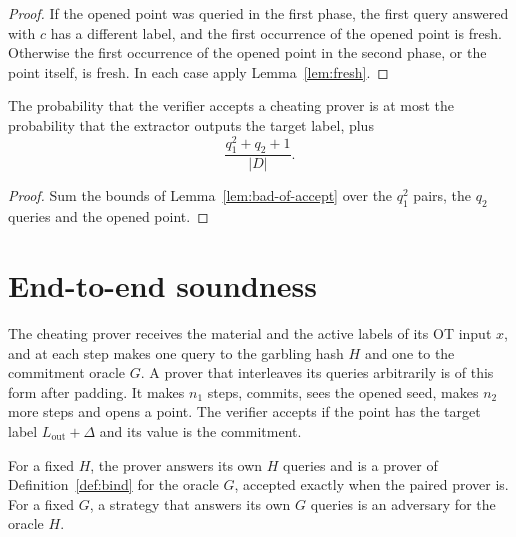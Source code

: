 \begin{proof}
  \leanok
  If the opened point was queried in the first phase, the first query answered with $c$ has a
  different label, and the first occurrence of the opened point is fresh. Otherwise the first
  occurrence of the opened point in the second phase, or the point itself, is fresh. In each case
  apply Lemma~\ref{lem:fresh}.
\end{proof}

\begin{theorem}
  \label{thm:binding}
  \leanok
  The probability that the verifier accepts a cheating prover is at most the probability that the
  extractor outputs the target label, plus
  \[ \frac{q_1^2 + q_2 + 1}{|D|} . \]
\end{theorem}

\begin{proof}
  \leanok
  Sum the bounds of Lemma~\ref{lem:bad-of-accept} over the $q_1^2$ pairs, the $q_2$ queries and the
  opened point.
\end{proof}

\section{End-to-end soundness}

\begin{definition}
  \label{def:pprover}
  \leanok
  The cheating prover receives the material and the active labels of its OT input $x$, and at
  each step makes one query to the garbling hash $H$ and one to the commitment oracle $G$. A prover
  that interleaves its queries arbitrarily is of this form after padding. It makes $n_1$ steps,
  commits, sees the opened seed, makes $n_2$ more steps and opens a point. The verifier accepts if
  the point has the target label $L_{\mathrm{out}} + \Delta$ and its value is the commitment.
\end{definition}

\begin{lemma}[Replays]
  \label{lem:replay}
  \leanok
  For a fixed $H$, the prover answers its own $H$ queries and is a prover of
  Definition~\ref{def:bind} for the oracle $G$, accepted exactly when the paired prover is. For a
  fixed $G$, a strategy that answers its own $G$ queries is an adversary for the oracle $H$.
\end{lemma}

